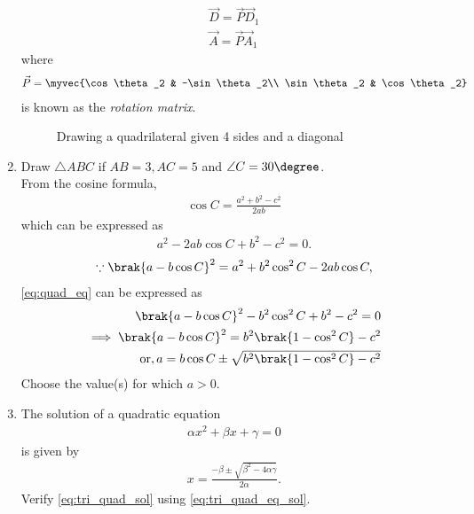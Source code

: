 \begin{enumerate}[label=\arabic*.,ref=\thesubsection.\theenumi]
\begin{align}
\label{eq:tri_rot_trans}
\vec{D} = \vec{P}\vec{D}_1
\\
\vec{A} = \vec{P}\vec{A}_1
\end{align}
%
where 
\begin{align}
\label{eq:tri_rot_mat}
\vec{P} = \myvec{\cos\theta_2 & -\sin \theta_2\\ \sin \theta_2 & \cos \theta_2}
\end{align}
%
is known as the {\em rotation matrix}.
\begin{figure}[!ht]
	\begin{center}
			\resizebox{\columnwidth}{!}{}
	\end{center}
	\caption{Drawing a quadrilateral given 4 sides and a diagonal}
	\label{fig:tri_rot}	
\end{figure}
%
\item Draw $\triangle ABC$ if $AB = 3, AC = 5$ and $\angle C = 30 \degree$.
%
\\
\solution From the cosine formula,
\begin{align}
\cos C = \frac{a^2+b^2-c^2}{2ab}
\end{align}
%
which can be expressed as
\begin{align}
\label{eq:quad_eq}
a^2 -2ab\cos C +b^2-c^2 = 0.
\end{align}
\begin{align}
\because \brak{a-b\cos C}^2 = a^2+b^2\cos^2C -2ab\cos C,
\end{align}
\eqref{eq:quad_eq} can be expressed as 
\begin{align}
\brak{a-b\cos C}^2 -b^2\cos^2C+b^2-c^2 = 0
\\
\implies \brak{a-b\cos C}^2 = b^2\brak{1-\cos^2C}-c^2
\\
\text{or}, a = b\cos C \pm \sqrt{b^2\brak{1-\cos^2C}-c^2}
\label{eq:tri_quad_sol}
\end{align}
%
Choose the value(s) for which $a > 0$.
\item The solution of a quadratic equation
\begin{align}
\label{eq:tri_quad_eq}
\alpha x^2 + \beta x + \gamma = 0
\end{align}
is given by 
\begin{align}
\label{eq:tri_quad_eq_sol}
x = \frac{-\beta \pm \sqrt{\beta^2 - 4\alpha\gamma}}{2\alpha}.
\end{align}
Verify \eqref{eq:tri_quad_sol} using \eqref{eq:tri_quad_eq_sol}.

\end{enumerate}
%
